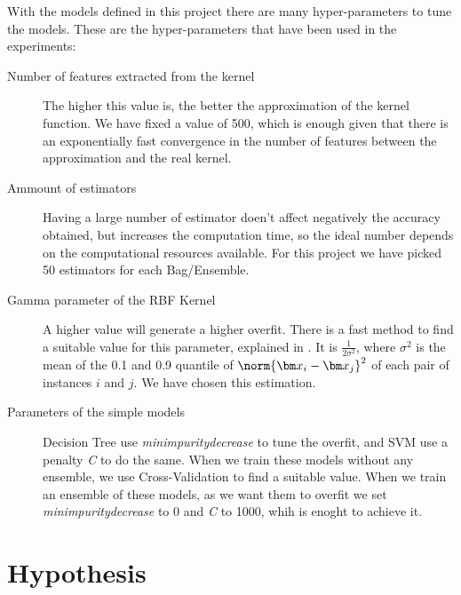 \begin{pre-delivery}
  With the models defined in this project there are many hyper-parameters to
  tune the models. These are the hyper-parameters that have been used in the
  experiments:
  \begin{description}
    \item[Number of features extracted from the kernel] The higher this value
    is, the better the approximation of the kernel function. We have fixed a
    value of 500, which is enough given that there is an exponentially fast
    convergence in the number of features between the approximation and
    the real kernel\cite{rahimi2008random}.
    \item[Ammount of estimators] Having a large number of estimator doen't
    affect negatively the accuracy obtained, but increases the computation
    time, so the ideal number depends on the computational resources
    available. For this project we have picked 50 estimators for each Bag/Ensemble.
    \item[Gamma parameter of the RBF Kernel] A higher value will generate a
    higher overfit. There is a fast method to find a suitable value for this
    parameter, explained in
    \cite{caputo2002appearance}
    . It is $\frac{1}{2\sigma^2}$, where $\sigma^2$ is the mean of the 0.1 and
    0.9 quantile of $\norm{\vx_i - \vx_j}^2$ of
    each pair of instances $i$ and $j$. We have chosen this estimation.
    \item[Parameters of the simple models] Decision Tree use
    \textit{min\tu impurity\tu decrease} to tune the overfit, and SVM use a
    penalty \textit{C} to do the same. When we train these models without
    any ensemble, we use Cross-Validation to find a suitable value. When we
    train an ensemble of these models, as we want them to overfit we set
    \textit{min\tu impurity\tu decrease} to 0 and \textit{C} to 1000, whih
    is enoght to achieve it.
  \end{description}
\end{pre-delivery}
\section{Hypothesis}



